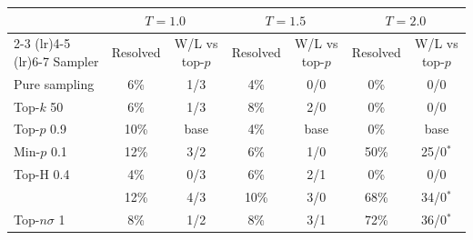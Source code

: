 \begin{tabular}{lcccccc}
\toprule
 & \multicolumn{2}{c}{$T{=}1.0$} & \multicolumn{2}{c}{$T{=}1.5$} & \multicolumn{2}{c}{$T{=}2.0$} \\
\cmidrule(lr){2-3} \cmidrule(lr){4-5} \cmidrule(lr){6-7}
Sampler & Resolved & W/L vs top-$p$ & Resolved & W/L vs top-$p$ & Resolved & W/L vs top-$p$ \\
\midrule
Pure sampling & 6\% & 1/3 & 4\% & 0/0 & 0\% & 0/0 \\
Top-$k$ 50 & 6\% & 1/3 & 8\% & 2/0 & 0\% & 0/0 \\
Top-$p$ 0.9 & 10\% & base & 4\% & base & 0\% & base \\
Min-$p$ 0.1 & 12\% & 3/2 & 6\% & 1/0 & 50\% & 25/0$^{*}$ \\
Top-H 0.4 & 4\% & 0/3 & 6\% & 2/1 & 0\% & 0/0 \\
\pless{} & 12\% & 4/3 & 10\% & 3/0 & 68\% & 34/0$^{*}$ \\
Top-$n\sigma$ 1 & 8\% & 1/2 & 8\% & 3/1 & 72\% & 36/0$^{*}$ \\
\bottomrule
\end{tabular}
